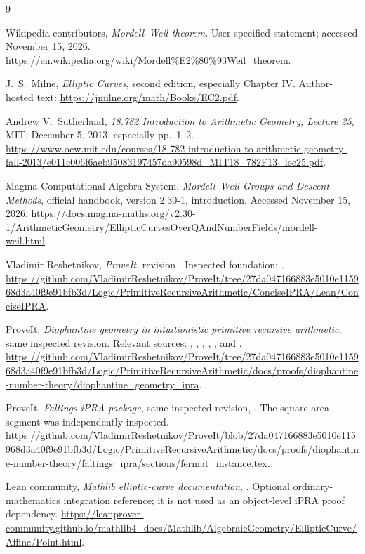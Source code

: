 \begin{thebibliography}{9}

Wikipedia contributors, \emph{Mordell--Weil theorem}.
User-specified statement; accessed November 15, 2026.
\url{https://en.wikipedia.org/wiki/Mordell%E2%80%93Weil_theorem}.

J.\ S.\ Milne, \emph{Elliptic Curves}, second edition,
especially Chapter IV.
Author-hosted text:
\url{https://jmilne.org/math/Books/EC2.pdf}.

Andrew V.\ Sutherland, \emph{18.782 Introduction to Arithmetic Geometry,
Lecture 25}, MIT, December 5, 2013, especially pp.\ 1--2.
\url{https://www.ocw.mit.edu/courses/18-782-introduction-to-arithmetic-geometry-fall-2013/e011c006f6aeb95083197457da90598d_MIT18_782F13_lec25.pdf}.

Magma Computational Algebra System,
\emph{Mordell--Weil Groups and Descent Methods}, official handbook,
version 2.30-1, introduction.
Accessed November 15, 2026.
\url{https://docs.magma-maths.org/v2.30-1/ArithmeticGeometry/EllipticCurvesOverQAndNumberFields/mordell-weil.html}.

Vladimir Reshetnikov, \emph{ProveIt}, revision
.
Inspected foundation:
.
\url{https://github.com/VladimirReshetnikov/ProveIt/tree/27da047166883e5010e115968d3a40f9e91bfb3d/Logic/PrimitiveRecursiveArithmetic/ConciseIPRA/Lean/ConciseIPRA}.

ProveIt, \emph{Diophantine geometry in intuitionistic primitive recursive
arithmetic}, same inspected revision.
Relevant sources: ,
, ,
, ,
and .
\url{https://github.com/VladimirReshetnikov/ProveIt/tree/27da047166883e5010e115968d3a40f9e91bfb3d/Logic/PrimitiveRecursiveArithmetic/docs/proofs/diophantine-number-theory/diophantine_geometry_ipra}.

ProveIt, \emph{Faltings iPRA package}, same inspected revision,
.
The square-area segment was independently inspected.
\url{https://github.com/VladimirReshetnikov/ProveIt/blob/27da047166883e5010e115968d3a40f9e91bfb3d/Logic/PrimitiveRecursiveArithmetic/docs/proofs/diophantine-number-theory/faltings_ipra/sections/fermat_instance.tex}.

Lean community, \emph{Mathlib elliptic-curve documentation},
.
Optional ordinary-mathematics integration reference; it is not used as
an object-level iPRA proof dependency.
\url{https://leanprover-community.github.io/mathlib4_docs/Mathlib/AlgebraicGeometry/EllipticCurve/Affine/Point.html}.

\end{thebibliography}
